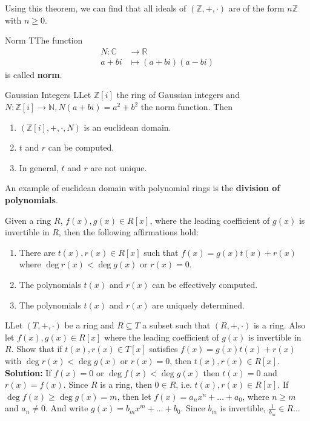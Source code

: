 \documentclass[12pt,a4paper]{article}
\begin{document}
Using this theorem, we can find that all ideals of $(\mathbb{Z},+,\cdot)$ are of the form $n \mathbb{Z}$ with $n \geq 0$.

\begin{defn}{Norm}
TThe function
\begin{equation*}
\begin{aligned}
N : \mathbb{C} & \to \mathbb{R} \\
a+bi & \mapsto (a+bi)(a-bi)
\end{aligned}
\end{equation*}
is called \textbf{norm}.
\end{defn}

\begin{thm}{Gaussian Integers}
LLet $\mathbb{Z}[i]$ the ring of Gaussian integers and $N : \mathbb{Z}[i] \to \mathbb{N}, N(a+bi) = a^2+b^2$ the norm function. Then
\begin{enumerate}
\item $(\mathbb{Z}[i],+,\cdot,N)$ is an euclidean domain.
\item $t$ and $r$ can be computed.
\item In general, $t$ and $r$ are not unique.
\end{enumerate}
\end{thm}

An example of euclidean domain with polynomial rings is the \textbf{division of polynomials}.

Given a ring $R$, $f(x), g(x) \in R[x]$, where the leading coefficient of $g(x)$ is invertible in $R$, then the following affirmations hold:
\begin{enumerate}
\item There are $t(x), r(x) \in R[x]$ such that $f(x) = g(x)t(x) + r(x)$ where $\deg r(x) < \deg g(x)$ or $r(x) = 0$.
\item The polynomials $t(x)$ and $r(x)$ can be effectively computed.
\item The polynomials $t(x)$ and $r(x)$ are uniquely determined.
\end{enumerate}

\begin{example}{}
LLet $(T,+,\cdot)$ be a ring and $R \subseteq T$ a subset such that $(R,+,\cdot)$ is a ring. Also let $f(x), g(x) \in R[x]$ where the leading coefficient of $g(x)$ is invertible in $R$. Show that if $t(x), r(x) \in T[x]$ satisfies $f(x) = g(x) t(x) + r(x)$ with $\deg r(x) < \deg g(x)$ or $r(x) = 0$, then $t(x), r(x) \in R[x]$. \\

\textbf{Solution: } If $f(x) = 0$ or $\deg f(x) < \deg g(x)$ then $t(x) = 0$ and $r(x) = f(x)$. Since $R$ is a ring, then $0 \in R$, i.e. $t(x), r(x) \in R[x]$. If $\deg f(x) \geq \deg g(x) = m$, then let $f(x) = a_nx^n + \ldots + a_0$, where $n \geq m$ and $a_n \neq 0$. And write $g(x) = b_m x^m + \ldots + b_0$. Since $b_m$ is invertible, $\frac{1}{b_m} \in R$...
\end{example}
\end{document}

